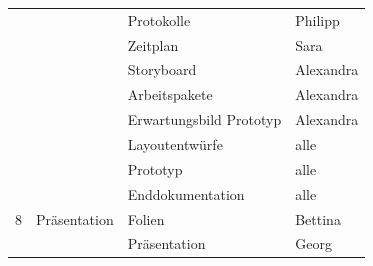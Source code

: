 \documentclass[10pt,a4paper,notitlepage]{report}
\begin{document}
\begin{center}
\begin{tabular}{l|l|l|l}
	&& Protokolle & Philipp\\
	&& Zeitplan & Sara\\
	&& Storyboard & Alexandra\\
	&& Arbeitspakete & Alexandra\\
	&& Erwartungsbild Prototyp & Alexandra\\
	&& Layoutentwürfe & alle\\
	&& Prototyp & alle\\
	&& Enddokumentation & alle\\\hline
	8 & Präsentation & Folien & Bettina\\
	&& Präsentation & Georg\\\hline
	\end{tabular}\
	\end{center}
	
	\clearpage
	\marginpar{\vspace{3.0mm} \color{orange}\rule{0.8mm}{53.3mm} \\[3mm] \color{hellorange}\rule{0.8mm}{170mm}}
	\par\bigskip
\end{document}
